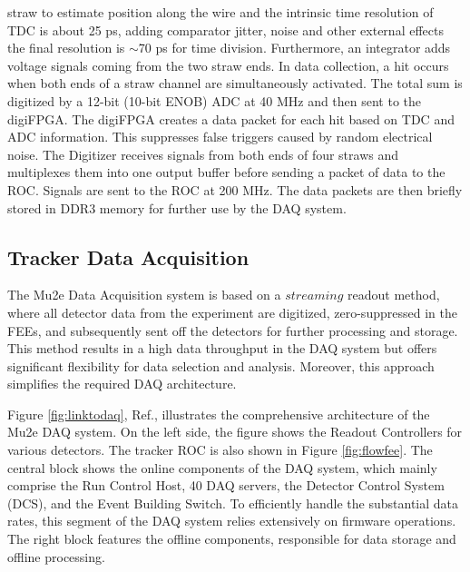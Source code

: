 straw to estimate position along the wire and the intrinsic time resolution of TDC is about 
25 ps, adding comparator jitter, noise and other external effects the final resolution is 
$\sim$70 ps for time division. Furthermore, an integrator adds voltage signals coming 
from the two straw ends. In data collection, a hit occurs when both ends of a straw channel 
are simultaneously activated. The total sum is digitized by a 12-bit (10-bit ENOB) ADC at 40 MHz
and then sent to the digiFPGA. The digiFPGA creates a data packet for each hit based on 
TDC and ADC information. This suppresses false triggers caused by random electrical noise. 
The Digitizer receives signals from both ends of four straws and multiplexes them into one 
output buffer before sending a packet of data to the ROC. Signals are sent to the ROC at 
200 MHz. The data packets are then briefly stored in DDR3 memory for further use by the 
DAQ system. 

\subsection{Tracker Data Acquisition}
The Mu2e Data Acquisition system is based on a $streaming$ readout method, 
where all detector data from the experiment are digitized, 
zero-suppressed in the FEEs, and subsequently sent off the detectors for further processing and storage. 
This method results in a high data throughput in the DAQ system but offers significant 
flexibility for data selection and analysis. Moreover, this approach simplifies the required DAQ architecture. 

Figure \ref{fig:linktodaq}, Ref.\cite{GIOIOSA2023167732}, illustrates the comprehensive 
architecture of the Mu2e DAQ system. On the left side, the figure shows the Readout Controllers 
for various detectors. The tracker ROC is also shown in Figure \ref{fig:flowfee}. 
The central block shows the online components of the DAQ system, which mainly comprise the Run Control Host, 
40 DAQ servers, the Detector Control System (DCS), and the Event Building Switch. 
To efficiently handle the substantial data rates, this segment of the DAQ system relies 
extensively on firmware operations. The right block features the offline components, responsible for data storage and offline processing.

